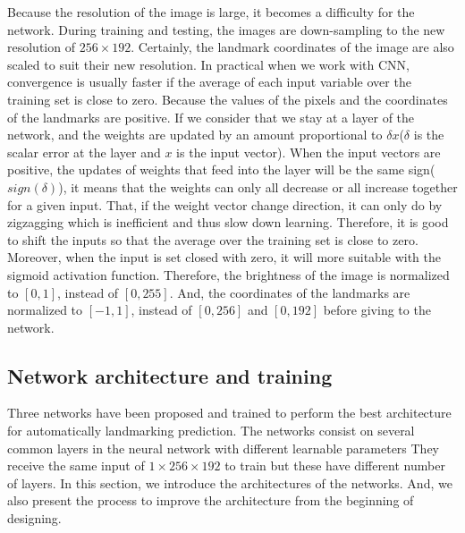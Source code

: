 \documentclass[conference]{IEEEtran}
\begin{document}
Because the resolution of the image is large, it becomes a difficulty for the network. During training and testing, the images are down-sampling to the new resolution of $256 \times 192$. Certainly, the landmark coordinates of the image are also scaled to suit their new resolution. In practical when we work with CNN, convergence is usually faster if the average of each input variable over the training set is close to zero. Because the values of the pixels and the coordinates of the landmarks are positive. If we consider that we stay at a layer of the network, and the weights are updated by an amount proportional to $\delta x$($\delta$ is the scalar error at the layer and $x$ is the input vector). When the input vectors are positive, the updates of weights that feed into the layer will be the same sign($sign(\delta)$), it means that the weights can only all decrease or all increase together for a given input. That, if the weight vector change direction, it can only do by zigzagging which is inefficient and thus slow down learning. Therefore, it is good to shift the inputs so that the average over the training set is close to zero. Moreover, when the input is set closed with zero, it will more suitable with the sigmoid activation function\cite{lecun2012efficient}. Therefore, the brightness of the image is normalized to $[0,1]$, instead of $[0,255]$. And, the coordinates of the landmarks are normalized to $[-1,1]$, instead of $[0,256]$ and $[0,192]$ before giving to the network.
\subsection{Network architecture and training}
Three networks have been proposed and trained to perform the best architecture for automatically landmarking prediction. The networks consist on several common layers in the neural network with different learnable parameters They receive the same input of $1 \times 256 \times 192$ to train but these have different number of layers. In this section, we introduce the architectures of the networks. And, we also present the process to improve the architecture from the beginning of designing.
\end{document}
